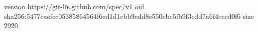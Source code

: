 version https://git-lfs.github.com/spec/v1
oid sha256:5477eaefcc05385864564f6ed1d1cbb9edd8e550cbc5fb9f3cdd7a6f4cccd0f6
size 2920
